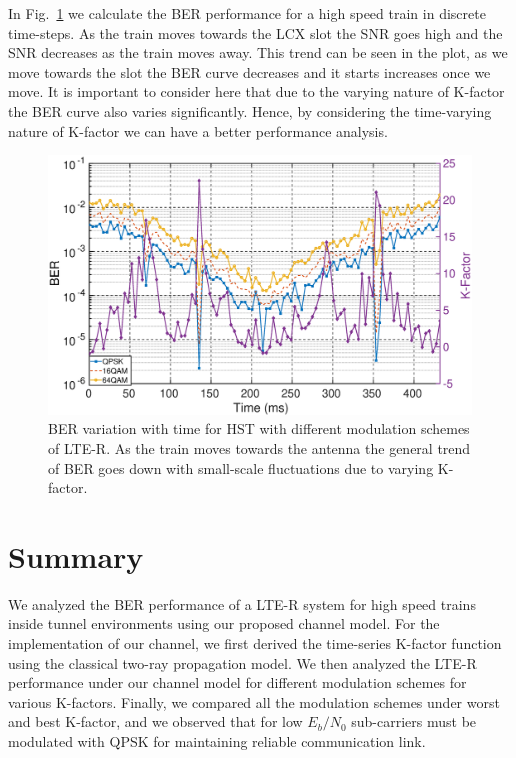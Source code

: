 In Fig.~\ref{kfactorber} we calculate the BER performance for a high speed train in discrete time-steps. As the train moves towards
the LCX slot the SNR goes high and the SNR decreases as the train moves away. This trend can be seen in the plot, as we move towards the slot the BER curve decreases and it starts increases once we move. It is important to consider here that due to the varying nature of K-factor the BER curve also varies significantly. Hence, by considering the time-varying nature of K-factor we can have a better performance analysis.

\begin{figure}[!ht]
\label{kfactorber}
\centering
\includegraphics[width=\textwidth,keepaspectratio]{images/Gill/lte_figs/kfactorcontinuous.eps} 
\caption{BER variation with time for HST with different modulation schemes of LTE-R. As the train moves towards
the antenna the general trend of BER goes down with small-scale fluctuations due to varying K-factor.}
\end{figure}

\section{Summary}
We analyzed the BER performance of a LTE-R system for high speed trains inside tunnel environments using our proposed channel model. For the implementation
of our channel, we first derived the time-series K-factor function using the classical two-ray propagation model. We then analyzed the LTE-R performance under our channel model for different modulation schemes for various K-factors. Finally, we compared all the modulation schemes under worst and best K-factor, and we observed that for low $E_b/N_0$
sub-carriers must be modulated with QPSK for maintaining reliable communication link.



